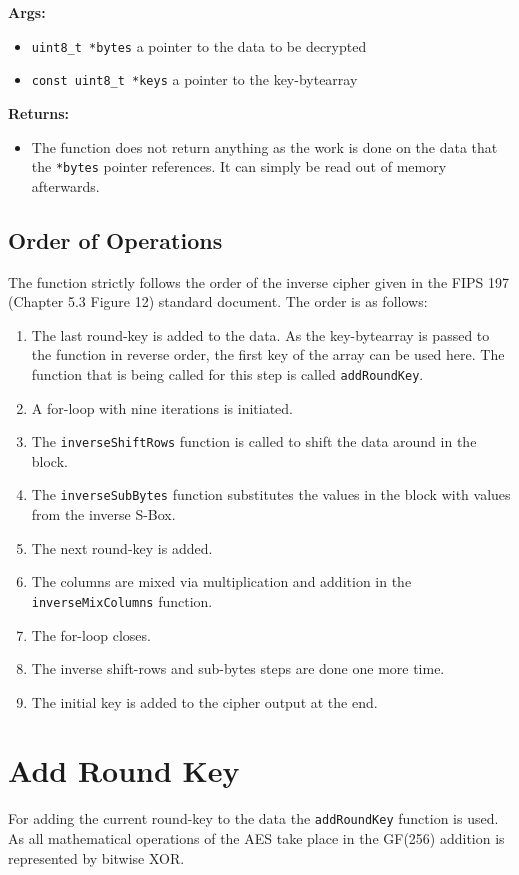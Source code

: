 \textbf{Args:}
\begin{itemize}
  \item \lstinline{uint8_t *bytes} a pointer to the data to be decrypted
  \item \lstinline{const uint8_t *keys} a pointer to the key-bytearray
\end{itemize}

\textbf{Returns:}
\begin{itemize}
  \item The function does not return anything as the work is done on the data that the \lstinline{*bytes} pointer references. It can simply be read out of memory afterwards.
\end{itemize}

\subsection{Order of Operations}
The function strictly follows the order of the inverse cipher given in the FIPS 197 (Chapter 5.3 Figure 12) standard document. The order is as follows:
\begin{enumerate}
  \item The last round-key is added to the data. As the key-bytearray is passed to the function in reverse order, the first key of the array can be used here. The function that is being called for this step is called \lstinline{addRoundKey}.
  \item A for-loop with nine iterations is initiated.
  \item The \lstinline{inverseShiftRows} function is called to shift the data around in the block.
  \item The \lstinline{inverseSubBytes} function substitutes the values in the block with values from the inverse S-Box.
  \item The next round-key is added.
  \item The columns are mixed via multiplication and addition in the \lstinline{inverseMixColumns} function.
  \item The for-loop closes.
  \item The inverse shift-rows and sub-bytes steps are done one more time.
  \item The initial key is added to the cipher output at the end.
\end{enumerate}


\section{Add Round Key}
\label{ch:dec_addroundkey}
For adding the current round-key to the data the \lstinline{addRoundKey} function is used. As all mathematical operations of the AES take place in the GF(256) addition is represented by bitwise \ac{XOR}.

